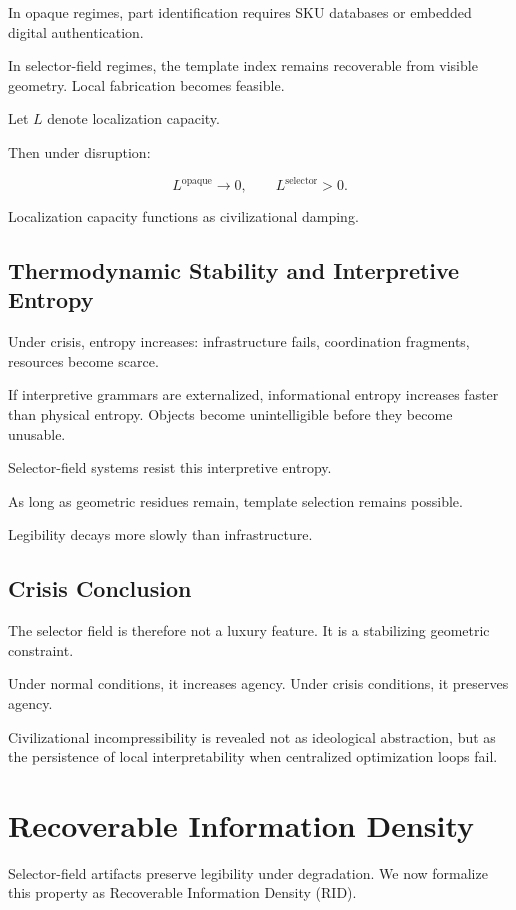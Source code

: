 \documentclass[11pt]{article}
\begin{document}
In opaque regimes, part identification requires SKU databases or embedded 
digital authentication.

In selector-field regimes, the template index remains recoverable from 
visible geometry. Local fabrication becomes feasible.

Let $L$ denote localization capacity.

Then under disruption:

\[
L^{\text{opaque}} \rightarrow 0, \qquad
L^{\text{selector}} > 0.
\]

Localization capacity functions as civilizational damping.

\subsection{Thermodynamic Stability and Interpretive Entropy}

Under crisis, entropy increases: infrastructure fails, coordination 
fragments, resources become scarce.

If interpretive grammars are externalized, informational entropy 
increases faster than physical entropy. Objects become unintelligible 
before they become unusable.

Selector-field systems resist this interpretive entropy.

As long as geometric residues remain, template selection remains possible.

Legibility decays more slowly than infrastructure.

\subsection{Crisis Conclusion}

The selector field is therefore not a luxury feature. 
It is a stabilizing geometric constraint.

Under normal conditions, it increases agency.
Under crisis conditions, it preserves agency.

Civilizational incompressibility is revealed not as ideological 
abstraction, but as the persistence of local interpretability 
when centralized optimization loops fail.

\section{Recoverable Information Density}

Selector-field artifacts preserve legibility under degradation. 
We now formalize this property as Recoverable Information Density (RID).
\end{document}

